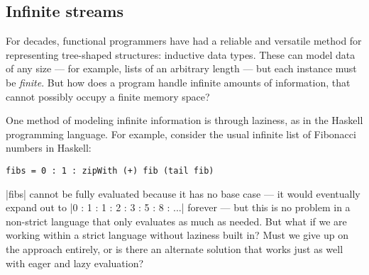 \subsection{Infinite streams}


For decades, functional programmers have had a reliable and versatile method for representing tree-shaped structures: inductive data types.
These can model data of any size --- for example, lists of an arbitrary length --- but each instance must be \emph{finite}.
But how does a program handle infinite amounts of information, that cannot possibly occupy a finite memory space?

One method of modeling infinite information is through laziness, as in the Haskell programming language.
For example, consider the usual infinite list of Fibonacci numbers in Haskell:
\begin{verbatim}
fibs = 0 : 1 : zipWith (+) fib (tail fib)
\end{verbatim}
\hs|fibs| cannot be fully evaluated because it has no base case --- it would eventually expand out to \hs|0 : 1 : 1 : 2 : 3 : 5 : 8 : ...| forever --- but this is no problem in a non-strict language that only evaluates as much as needed.
But what if we are working within a strict language without laziness built in?
Must we give up on the approach entirely, or is there an alternate solution that works just as well with eager and lazy evaluation?

